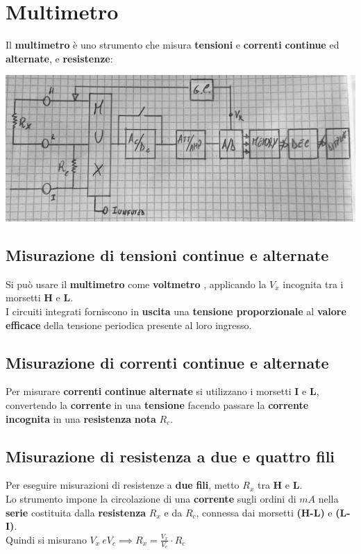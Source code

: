 \chapter{Multimetro}
Il \textbf{multimetro} è uno strumento che misura \textbf{tensioni} e \textbf{correnti} \textbf{continue} ed \textbf{alternate}, e \textbf{resistenze}:
\begin{center}
    \includegraphics[width=\textwidth]{Images/figure1.jpg}
\end{center}
\section{Misurazione di tensioni continue e alternate}
Si può usare il \textbf{multimetro} come \textbf{voltmetro} , applicando la $V_x$ incognita tra i morsetti \textbf{H} e \textbf{L}.\\
I circuiti integrati forniscono in \textbf{uscita} una \textbf{tensione proporzionale} al \textbf{valore efficace} della tensione periodica presente al loro ingresso.
\section{Misurazione di correnti continue e alternate}
Per misurare \textbf{correnti} \textbf{continue} \textbf{alternate} si utilizzano i morsetti \textbf{I} e \textbf{L}, convertendo la \textbf{corrente} in una \textbf{tensione} facendo passare la \textbf{corrente} \textbf{incognita} in una \textbf{resistenza} \textbf{nota} $R_c$.
\section{Misurazione di resistenza a due e quattro fili}
Per eseguire misurazioni di resistenze a \textbf{due} \textbf{fili}, metto $R_x$ tra \textbf{H} e \textbf{L}.\\
Lo strumento impone la circolazione di una \textbf{corrente} sugli ordini di $mA$ nella \textbf{serie} costituita dalla \textbf{resistenza} $R_x$ e da $R_c$, connessa dai morsetti \textbf{(H-L)} e \textbf{(L-I)}.\\
Quindi si misurano $V_x \ e V_c \implies R_x = \frac{V_x}{V_c} \cdot R_c$